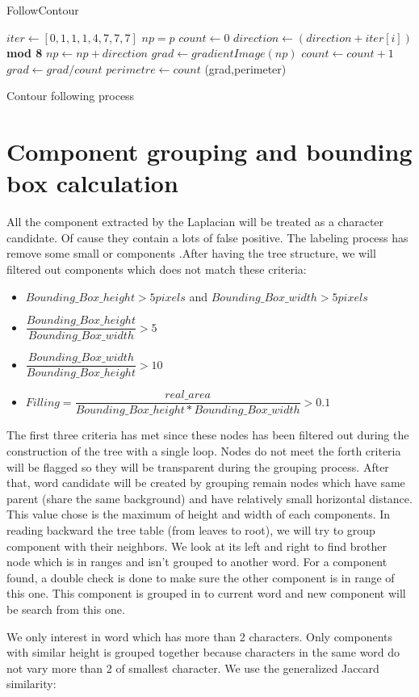 \begin{algorithm}
\caption{FollowContour}\label{alg:ContourFollowing}
\begin{algorithmic}[1]
\State $iter \gets [0,1,1,1,4,7,7,7]$
\State $np = p$ 
\State $count \gets 0$
\Repeat 
{}
	\State $direction \gets (direction + iter[i])$ \textbf{ mod 8}
		\State $np \gets np+direction$
		\State $grad \gets gradientImage(np)$
		\State $count \gets count+1$
	\EndIf
\EndFor
{}
\State $grad\gets grad/count$
\State $perimetre \gets count $
\State \Return (grad,perimeter)
\EndProcedure
\end{algorithmic}
\caption{Contour following process}
\end{algorithm}

\section{Component grouping and bounding box calculation} \label{Grouping}
\par
All the component extracted by the Laplacian will be treated as a character candidate. Of cause they contain a lots of false positive. The labeling process has remove some small or  components .After having the tree structure, we will filtered out components which does not match these criteria:
\begin{itemize} 
	\item $Bounding\_Box\_height >5 pixels $ and $Bounding\_Box\_width>5 pixels $
	\item $\dfrac{Bounding\_Box\_height}{Bounding\_Box\_width} >5 $  
	\item $\dfrac{Bounding\_Box\_width}{Bounding\_Box\_height} >10 $	
	\item $Filling =\dfrac{real\_area}{Bounding\_Box\_height*Bounding\_Box\_width} >0.1$
\end{itemize}
\par
The first three criteria has met since these nodes has been filtered out during the construction of the tree with a single loop. Nodes do not meet the forth criteria will be flagged so they will be transparent during the grouping process. After that, word candidate will be created by grouping remain nodes which have same parent (share the same background) and have relatively small horizontal distance. This value chose is the maximum of height and width of each components. In reading backward the tree table (from leaves to root), we will try to group component with their neighbors. We look at its left and right to find brother node which is in ranges and isn't grouped to another word. For a component found, a double check is done to make sure the other component is in range of this one. This component is grouped in to current word and new component will be search from this one. 
\par
We only interest in word which has more than 2 characters. Only components with similar height is grouped together because characters in the same word do not vary more than 2 of smallest character. We use the generalized Jaccard similarity: 

